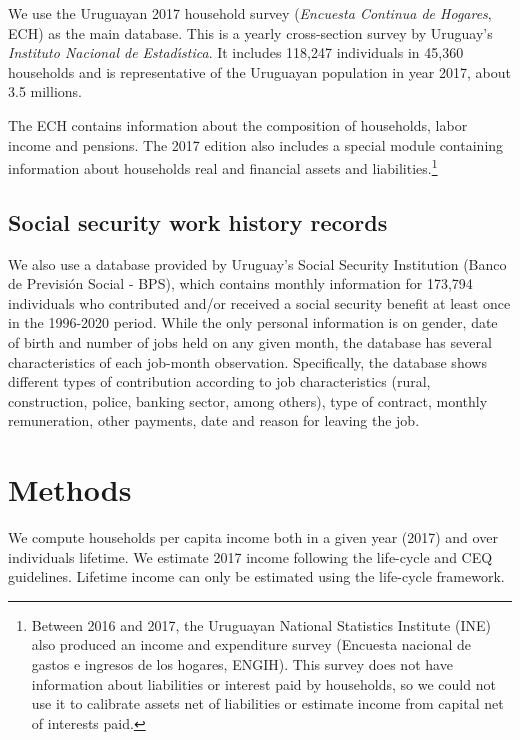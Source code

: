 \documentclass{article}
\begin{document}
We use the Uruguayan 2017 household survey  (\textit{Encuesta Continua de Hogares}, ECH) as the main database. This is a yearly cross-section survey by Uruguay's  \textit{Instituto Nacional de Estad\'{\i}stica}. It includes 118,247 individuals in 45,360 households and is representative of the Uruguayan population in year 2017, about 3.5 millions. 

The ECH contains information about the composition of households, labor income and pensions. The 2017 edition also includes a special module containing information about households real and financial assets and liabilities.\footnote{Between 2016 and 2017, the Uruguayan National Statistics Institute (INE) also produced an income and expenditure survey (Encuesta nacional de gastos e ingresos de los hogares, ENGIH). This survey does not have information about liabilities or interest paid by households, so we could not use it to calibrate assets net of liabilities or estimate income from capital net of interests paid.} 

 



\subsection{Social security work history records}
We also use a database provided by Uruguay's Social Security Institution (Banco de Previsión Social - BPS), which contains monthly information for 173,794 individuals who contributed and/or received a social security benefit at least once in the 1996-2020 period. While the only personal information is on gender, date of birth and number of jobs held on any given month, the database has several characteristics of each job-month observation. Specifically, the database shows different types of contribution according to job characteristics (rural, construction, police, banking sector, among others), type of contract, monthly remuneration, other payments, date and reason for leaving the job.

\section{Methods} \label{sec:methods}

We compute households per capita income  both in a given year (2017) and over individuals lifetime. We estimate 2017 income following the life-cycle and CEQ guidelines. Lifetime income can only be estimated using the life-cycle framework. 
\end{document}
